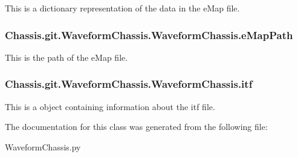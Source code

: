 This is a dictionary representation of the data in the e\-Map file. 

\hypertarget{class_chassis_8git_1_1_waveform_chassis_1_1_waveform_chassis_ae0368ac25643a170bdd6584ea3ea90cb}{
\subsubsection[{e\-Map\-Path}]{\setlength{\rightskip}{0pt plus 5cm}Chassis.\-git.\-Waveform\-Chassis.\-Waveform\-Chassis.\-e\-Map\-Path}}\label{class_chassis_8git_1_1_waveform_chassis_1_1_waveform_chassis_ae0368ac25643a170bdd6584ea3ea90cb}


This is the path of the e\-Map file. 

\hypertarget{class_chassis_8git_1_1_waveform_chassis_1_1_waveform_chassis_a71d5648046e72865b346e57b83781eb4}{
\subsubsection[{itf}]{\setlength{\rightskip}{0pt plus 5cm}Chassis.\-git.\-Waveform\-Chassis.\-Waveform\-Chassis.\-itf}}\label{class_chassis_8git_1_1_waveform_chassis_1_1_waveform_chassis_a71d5648046e72865b346e57b83781eb4}


This is a object containing information about the itf file. 



The documentation for this class was generated from the following file\-:\begin{DoxyCompactItemize}
\item 
Waveform\-Chassis.\-py\end{DoxyCompactItemize}

